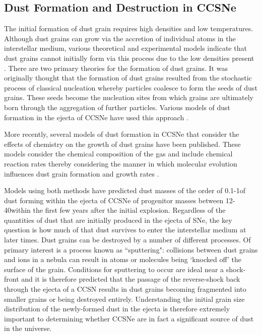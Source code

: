 \subsection{Dust Formation and Destruction in CCSNe}
\label{scn:dust_formation}

The initial formation of dust grain requires high densities and low temperatures.  Although dust grains can grow via the accretion of individual atoms in the interstellar medium, various theoretical and experimental models indicate that dust grains cannot initially form via this process due to the low densities present \citep{Osterbrock2006}.  There are two primary theories for the formation of dust grains.  It was originally thought that the formation of dust grains resulted from the stochastic process of classical nucleation whereby particles coalesce to form the seeds of dust grains.  These seeds become the nucleation sites from which grains are ultimately born through the aggregation of further particles.  Various models of dust formation in the ejecta of CCSNe have used this approach \citep{Kozasa1989, Todini2001,Nozawa2003, Schneider2004}.  

More recently, several models of dust formation in CCSNe that consider the effects of chemistry on the growth of dust grains have been published.   These models consider the chemical composition of the gas and include chemical reaction rates thereby considering the manner in which molecular evolution influences dust grain formation and growth rates \citep{Cherchneff2009, Cherchneff2010, Sarangi2013, Sarangi2015}.

Models using both methods have predicted dust masses of the order of 0.1-1\msun of dust forming within the ejecta of CCSNe of progenitor masses between 12-40\msun within the first few years after the initial explosion.  Regardless of the quantities of dust that are initially produced in the ejecta of SNe, the key question is how much of that dust survives to enter the interstellar medium at later times. Dust grains can be destroyed by a number of different processes.  Of primary interest is a process known as ``sputtering": collisions between dust grains and ions in a nebula can result in atoms or molecules being `knocked off' the surface of the grain.  Conditions for sputtering to occur are ideal near a shock-front \citep{Barlow1977} and it is therefore predicted that the passage of the reverse-shock back through the ejecta of a CCSN results in dust grains becoming fragmented into smaller grains or being destroyed entirely.  Understanding the initial grain size distribution of the newly-formed dust in the ejecta is therefore extremely important to determining whether CCSNe are in fact a significant source of dust in the universe.

